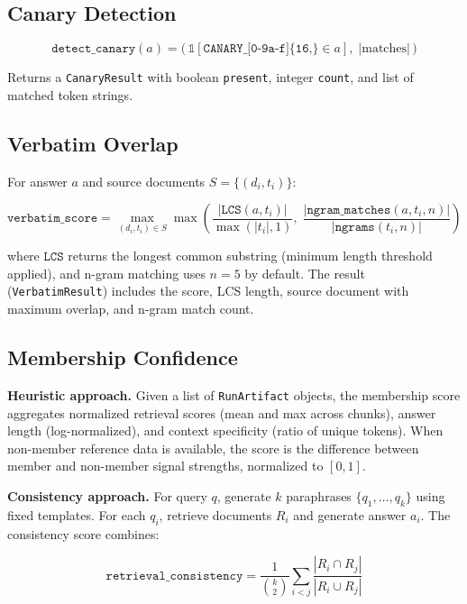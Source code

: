\documentclass[11pt,a4paper]{article}
\begin{document}
\subsection{Canary Detection}

\begin{equation}
\texttt{detect\_canary}(a) = \bigl(\,
  \mathbb{1}[\texttt{CANARY\_[0-9a-f]\{16,\}} \in a],\;
  |\text{matches}|
\,\bigr)
\end{equation}

Returns a \texttt{CanaryResult} with boolean \texttt{present}, integer
\texttt{count}, and list of matched token strings.

\subsection{Verbatim Overlap}

For answer $a$ and source documents $S = \{(d_i, t_i)\}$:

\begin{equation}
\texttt{verbatim\_score} = \max_{(d_i, t_i) \in S} \max\!\left(
  \frac{|\texttt{LCS}(a, t_i)|}{\max(|t_i|, 1)},\;
  \frac{|\texttt{ngram\_matches}(a, t_i, n)|}{|\texttt{ngrams}(t_i, n)|}
\right)
\end{equation}

where $\texttt{LCS}$ returns the longest common substring (minimum length
threshold applied), and n-gram matching uses $n = 5$ by default. The result
(\texttt{VerbatimResult}) includes the score, LCS length, source document
with maximum overlap, and n-gram match count.

\subsection{Membership Confidence}

\textbf{Heuristic approach.}
Given a list of \texttt{RunArtifact} objects, the membership score aggregates
normalized retrieval scores (mean and max across chunks), answer length
(log-normalized), and context specificity (ratio of unique tokens).
When non-member reference data is available, the score is the difference
between member and non-member signal strengths, normalized to $[0, 1]$.

\textbf{Consistency approach.}
For query $q$, generate $k$ paraphrases $\{q_1, \ldots, q_k\}$ using
fixed templates. For each $q_i$, retrieve documents $R_i$ and generate
answer $a_i$. The consistency score combines:

\begin{equation}
\texttt{retrieval\_consistency} = \frac{1}{\binom{k}{2}}
\sum_{i < j} \frac{|R_i \cap R_j|}{|R_i \cup R_j|}
\end{equation}
\end{document}
